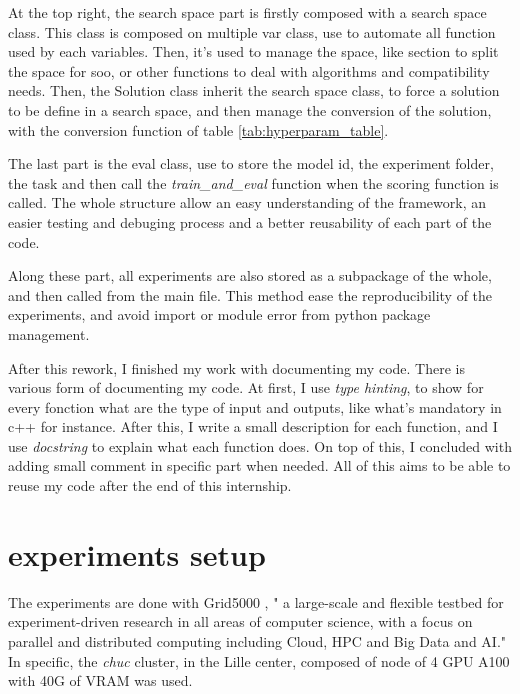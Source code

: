 At the top right, the search space part is firstly composed with a search space class. This class is composed on multiple var class, use to automate all function used by each variables. Then, it's used to manage the space, like section to split the space for \acrshort{soo}, or other functions to deal with algorithms and compatibility needs. Then, the Solution class inherit the search space class, to force a solution to be define in a search space, and then manage the conversion of the solution, with the conversion function of table \ref{tab:hyperparam_table}.

The last part is the eval class, use to store the model id, the experiment folder, the task and then call the \textit{train\_and\_eval} function when the scoring function is called. The whole structure allow an easy understanding of the framework, an easier testing and debuging process and a better reusability of each part of the code. 

Along these part, all experiments are also stored as a subpackage of the whole, and then called from the main file. This method ease the reproducibility of the experiments, and avoid import or module error from python package management. 

After this rework, I finished my work with documenting my code. There is various form of documenting my code. At first, I use \textit{type hinting}, to show for every fonction what are the type of input and outputs, like what's mandatory in c++ for instance. After this, I write a small description for each function, and I use \textit{docstring} to explain what each function does. On top of this, I concluded with adding small comment in specific part when needed. All of this aims to be able to reuse my code after the end of this internship.

\section{experiments setup}
\label{sec:exp_setup}

The experiments are done with Grid5000 \cite{balouek_adding_2012}, " a large-scale and flexible testbed for experiment-driven research in all areas of computer science, with a focus on parallel and distributed computing including Cloud, HPC and Big Data and AI." In specific, the \textit{chuc} cluster, in the Lille center, composed of node of 4 GPU A100 with 40G of VRAM was used. 

